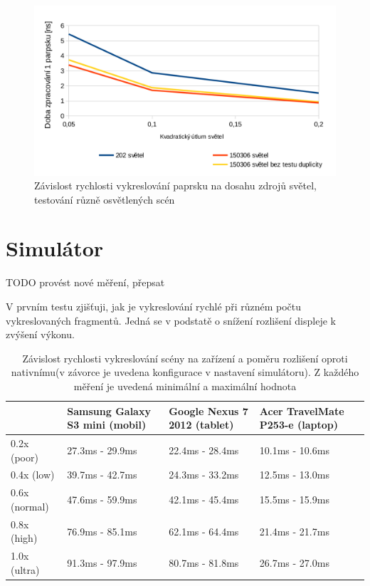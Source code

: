 \documentclass[11pt,twoside,a4paper]{book}
\begin{document}
\begin{figure}[h!]
\includegraphics[width=150mm]{figures/graf3.png}
\caption{Závislost rychlosti vykreslování paprsku na dosahu zdrojů světel, testování různě osvětlených scén}
\end{figure}

\section{Simulátor}
TODO provést nové měření, přepsat

V prvním testu zjišťuji, jak je vykreslování rychlé při různém počtu vykreslovaných fragmentů. Jedná se v podstatě o snížení rozlišení displeje k zvýšení výkonu.

\begin{table}[h!]
\begin{center}
\begin{tabular}{|p{35mm}|p{35mm}|p{35mm}|p{35mm}|}
\hline
& \textbf{Samsung Galaxy S3 mini (mobil)} & \textbf{Google Nexus 7 2012 (tablet)} & \textbf{Acer TravelMate P253-e (laptop)} \\
\hline
0.2x (poor) & 27.3ms - 29.9ms & 22.4ms - 28.4ms & 10.1ms - 10.6ms \\ \hline
0.4x (low) & 39.7ms - 42.7ms & 24.3ms - 33.2ms & 12.5ms - 13.0ms \\ \hline
0.6x (normal) & 47.6ms - 59.9ms & 42.1ms - 45.4ms & 15.5ms - 15.9ms \\ \hline
0.8x (high) & 76.9ms - 85.1ms & 62.1ms - 64.4ms & 21.4ms - 21.7ms \\ \hline
1.0x (ultra) & 91.3ms - 97.9ms & 80.7ms - 81.8ms & 26.7ms - 27.0ms \\ \hline
\end{tabular}
\caption{Závislost rychlosti vykreslování scény na zařízení a poměru rozlišení oproti nativnímu(v závorce je uvedena konfigurace v nastavení simulátoru). Z každého měření je uvedená minimální a maximální hodnota}
\end{center}
\end{table}
\end{document}
